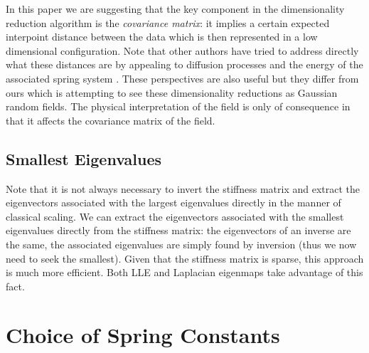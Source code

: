 In this paper we are suggesting that the key component in the
dimensionality reduction algorithm is the \emph{covariance matrix}: it
implies a certain expected interpoint distance between the data which
is then represented in a low dimensional configuration. Note that
other authors have tried to address directly what these distances are
by appealing to diffusion processes and the energy of the associated
spring system \citep{Coifman:diffusion06,Hughes:spring09}. These
perspectives are also useful but they differ from ours which is
attempting to see these dimensionality reductions as Gaussian random
fields. The physical interpretation of the field is only of
consequence in that it affects the covariance matrix of the field.

\subsection{Smallest Eigenvalues}

Note that it is not always necessary to invert the stiffness matrix and
extract the eigenvectors associated with the largest eigenvalues
directly in the manner of classical scaling. We can extract the
eigenvectors associated with the smallest eigenvalues directly from
the stiffness matrix: the eigenvectors of an inverse are the same, the
associated eigenvalues are simply found by inversion (thus we now need
to seek the smallest). Given that the stiffness matrix is sparse, this
approach is much more efficient. Both LLE and Laplacian eigenmaps take
advantage of this fact.


\section{Choice of Spring Constants}

